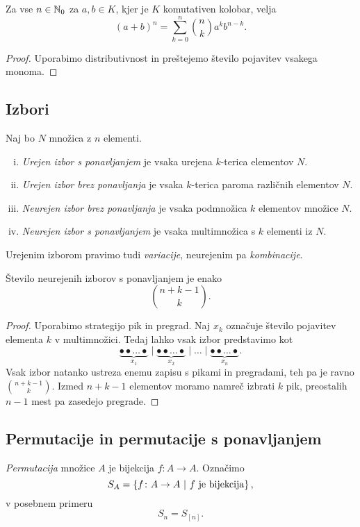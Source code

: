 \begin{izrek}[Binomski]
Za vse $n \in \mathbb{N}_0$ za $a, b \in K$, kjer je $K$ komutativen
kolobar, velja
\[
(a+b)^n = \sum_{k=0}^n \binom{n}{k} a^k b^{n-k}.
\]
\end{izrek}

\begin{proof}
Uporabimo distributivnost in preštejemo število pojavitev vsakega
monoma.
\end{proof}

\newpage

\subsection{Izbori}

\begin{definicija}
Naj bo $N$ množica z $n$ elementi.

\begin{enumerate}[i)]
\item \emph{Urejen izbor s ponavljanjem} je vsaka
urejena $k$-terica elementov $N$.
\item \emph{Urejen izbor brez ponavljanja} je vsaka $k$-terica
paroma različnih elementov $N$.
\item \emph{Neurejen izbor brez ponavljanja} je vsaka podmnožica
$k$ elementov množice $N$.
\item \emph{Neurejen izbor s ponavljanjem} je vsaka multimnožica
s $k$ elementi iz $N$.
\end{enumerate}
\end{definicija}

\begin{opomba}
Urejenim izborom pravimo tudi \emph{variacije}, neurejenim pa
\emph{kombinacije}.
\end{opomba}

\begin{trditev}
Število neurejenih izborov s ponavljanjem je enako
\[
\binom{n+k-1}{k}.
\]
\end{trditev}

\begin{proof}
Uporabimo strategijo pik in pregrad. Naj $x_k$ označuje število
pojavitev elementa $k$ v multimnožici. Tedaj lahko vsak izbor
predstavimo kot
\[
\underbrace{\bullet \bullet \dots \bullet}_{x_1} \mid
\underbrace{\bullet \bullet \dots \bullet}_{x_2} \mid
\dots \mid
\underbrace{\bullet \bullet \dots \bullet}_{x_n}.
\]
Vsak izbor natanko ustreza enemu zapisu s pikami in pregradami, teh
pa je ravno $\binom{n+k-1}{k}$. Izmed $n+k-1$ elementov moramo
namreč izbrati $k$ pik, preostalih $n-1$ mest pa zasedejo pregrade.
\end{proof}

\newpage

\subsection{Permutacije in permutacije s ponavljanjem}

\begin{definicija}
\emph{Permutacija} množice $A$ je bijekcija
$f \colon A \to A$. Označimo
\[
S_A = \left\{f \colon A \to A~\middle\vert~\text{$f$ je bijekcija}\right\},
\]
v posebnem primeru
\[
S_n = S_{[n]}.
\]
\end{definicija}
